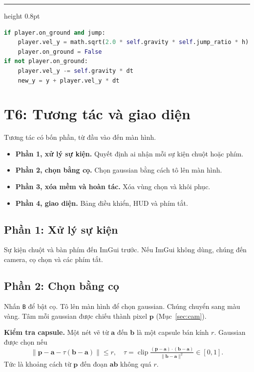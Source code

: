 \documentclass[9pt,twocolumn,a4paper]{extarticle}
\newenvironment{codebox}{\par\vspace{5pt}\noindent\begin{minipage}{\columnwidth}\hrule height 0.8pt\vspace{2pt}}{\end{minipage}\par\vspace{5pt}\noindent\ignorespaces}
\newcommand{\code}[1]{\texttt{#1}}
\begin{document}
\begin{codebox}
\begin{lstlisting}[language=Python,caption={\code{core/physics.py}, \code{Physics.walk}: nhảy và trọng lực},label={lst:jump}]
if player.on_ground and jump:
    player.vel_y = math.sqrt(2.0 * self.gravity * self.jump_ratio * h)
    player.on_ground = False
if not player.on_ground:
    player.vel_y -= self.gravity * dt
    new_y = y + player.vel_y * dt
\end{lstlisting}
\end{codebox}

\section{T6: Tương tác và giao diện}
\label{chap:t6}
Tương tác có bốn phần, từ đầu vào đến màn hình.
\begin{itemize}\itemsep0pt
\item \textbf{Phần 1, xử lý sự kiện.} Quyết định ai nhận mỗi sự kiện chuột hoặc phím.
\item \textbf{Phần 2, chọn bằng cọ.} Chọn gaussian bằng cách tô lên màn hình.
\item \textbf{Phần 3, xóa mềm và hoàn tác.} Xóa vùng chọn và khôi phục.
\item \textbf{Phần 4, giao diện.} Bảng điều khiển, HUD và phím tắt.
\end{itemize}

\subsection{Phần 1: Xử lý sự kiện}
Sự kiện chuột và bàn phím đến ImGui trước. Nếu ImGui không dùng, chúng đến camera, cọ chọn và các phím tắt.

\subsection{Phần 2: Chọn bằng cọ}
Nhấn \code{B} để bật cọ. Tô lên màn hình để chọn gaussian. Chúng chuyển sang màu vàng. Tâm mỗi gaussian được chiếu thành pixel $\mathbf{p}$ (Mục~\ref{sec:cam}). 

\textbf{Kiểm tra capsule.} Một nét vẽ từ $\mathbf{a}$ đến $\mathbf{b}$ là một capsule bán kính $r$. Gaussian được chọn nếu
\begin{equation}
\lVert\mathbf{p}-\mathbf{a}-\tau(\mathbf{b}-\mathbf{a})\rVert\le r,\quad \tau=\operatorname{clip}\tfrac{(\mathbf{p}-\mathbf{a})\cdot(\mathbf{b}-\mathbf{a})}{\lVert\mathbf{b}-\mathbf{a}\rVert^2}\in[0,1].
\label{eq:capsule}
\end{equation}
Tức là khoảng cách từ $\mathbf{p}$ đến đoạn $\mathbf{ab}$ không quá $r$.
\end{document}
